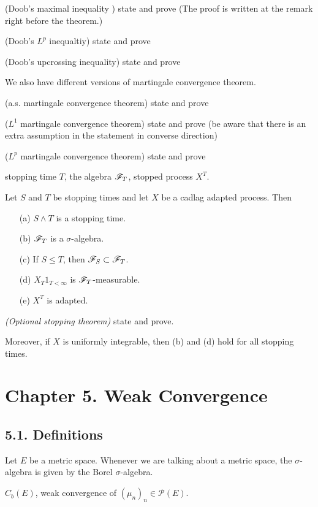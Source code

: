 \documentclass[10pt,a4paper]{report}
\begin{document}
(Doob's maximal inequality ) state and prove
(The proof is written at the remark right before the theorem.)
\s

(Doob's $L^p$ inequaltiy) state and prove
\s

(Doob's upcrossing inequality) state and prove
\s

We also have different versions of martingale convergence theorem.
\s

 (a.s. martingale convergence theorem) state and prove
\s

 ($L^1$ martingale convergence theorem) state and prove (be aware that there is an extra assumption in the statement in converse direction)
\s

 ($L^p$ martingale convergence theorem) state and prove
\s

stopping time $T$, the algebra $\mathscr{F}_T$, stopped process $X^T$.
\s

 Let $S$ and $T$ be stopping times and let $X$ be a cadlag adapted process. Then
\begin{itemize}
\item[(a)] $S\wedge T$ is a stopping time.
\item[(b)] $\mathscr{F}_T$ is a $\sigma$-algebra.
\item[(c)] If $S\leq T$, then $\mathscr{F}_S \subset \mathscr{F}_T$.
\item[(d)] $X_T 1_{T<\infty}$ is $\mathscr{F}_T$-measurable.
\item[(e)] $X^T$ is adapted.
\end{itemize}
\s

 \emph{(Optional stopping theorem)}  state and prove.

Moreover, if $X$ is uniformly integrable, then (b) and (d) hold for all stopping times.

\section*{Chapter 5. Weak Convergence}

\subsection*{5.1. Definitions}

Let $E$ be a metric space. Whenever we are talking about a metric space, the $\sigma$-algebra is given by the Borel $\sigma$-algebra.

\quad $C_b(E)$, weak convergence of $(\mu_n)_n \in \mathscr{P}(E)$.
\s
\end{document}
